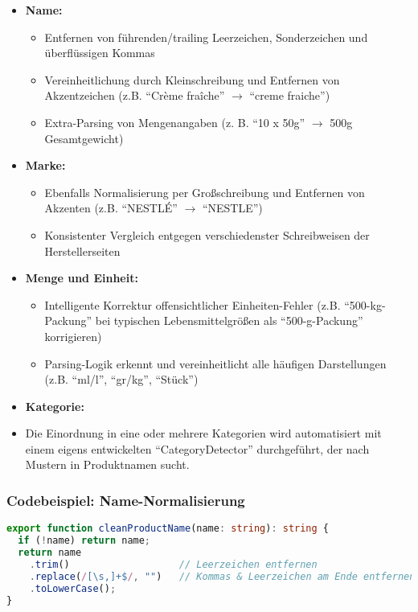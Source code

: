 \documentclass[12pt, a4paper]{report} %
\begin{document}
\begin{itemize}
    \item \textbf{Name:}
      \begin{itemize}
        \item Entfernen von führenden/trailing Leerzeichen, Sonderzeichen und überflüssigen Kommas
        \item Vereinheitlichung durch Kleinschreibung und Entfernen von Akzentzeichen (z.B. "`Crème fraîche"' $\to$ "`creme fraiche"')
        \item Extra-Parsing von Mengenangaben (z. B. "`10 x 50g"' $\to$ 500g Gesamtgewicht)
      \end{itemize}
    \item \textbf{Marke:}
      \begin{itemize}
        \item Ebenfalls Normalisierung per Großschreibung und Entfernen von Akzenten (z.B. "`NESTLÉ"' $\to$ "`NESTLE"')
        \item Konsistenter Vergleich entgegen verschiedenster Schreibweisen der Herstellerseiten
      \end{itemize}
    \item \textbf{Menge und Einheit:}
      \begin{itemize}
        \item Intelligente Korrektur offensichtlicher Einheiten-Fehler (z.B. "`500-kg-Packung"' bei typischen Lebensmittelgrößen als "`500-g-Packung"' korrigieren)
        \item Parsing-Logik erkennt und vereinheitlicht alle häufigen Darstellungen (z.B. "`ml/l"', "`gr/kg"', "`Stück"')
      \end{itemize}
    \item \textbf{Kategorie:}
      \item Die Einordnung in eine oder mehrere Kategorien wird automatisiert mit einem eigens entwickelten "`CategoryDetector"' durchgeführt, der nach Mustern in Produktnamen sucht.
\end{itemize}

\subsubsection{Codebeispiel: Name-Normalisierung}
\begin{lstlisting}[language=TypeScript, caption={Vereinheitlichung von Produktnamen}]
export function cleanProductName(name: string): string {
  if (!name) return name;
  return name
    .trim()                   // Leerzeichen entfernen
    .replace(/[\s,]+$/, "")   // Kommas & Leerzeichen am Ende entfernen
    .toLowerCase();
}
\end{lstlisting}
\end{document}
